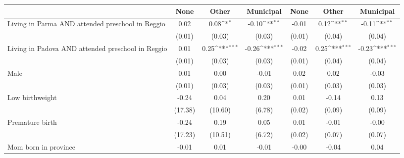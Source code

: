{
\def\sym#1{\ifmmode^{#1}\else\(^{#1}\)\fi}
\begin{tabular}{l*{6}{c}}
\toprule
                    &\multicolumn{1}{c}{None}&\multicolumn{1}{c}{Other}&\multicolumn{1}{c}{Municipal}&\multicolumn{1}{c}{None}&\multicolumn{1}{c}{Other}&\multicolumn{1}{c}{Municipal}\\
\midrule
Living in Parma AND attended preschool in Reggio&        0.02         &        0.08\sym{*}  &       -0.10\sym{**} &       -0.01         &        0.12\sym{**} &       -0.11\sym{**} \\
                    &      (0.01)         &      (0.03)         &      (0.03)         &      (0.01)         &      (0.04)         &      (0.04)         \\
\addlinespace
Living in Padova AND attended preschool in Reggio&        0.01         &        0.25\sym{***}&       -0.26\sym{***}&       -0.02         &        0.25\sym{***}&       -0.23\sym{***}\\
                    &      (0.01)         &      (0.03)         &      (0.03)         &      (0.01)         &      (0.04)         &      (0.04)         \\
\addlinespace
Male                &        0.01         &        0.00         &       -0.01         &        0.02         &        0.02         &       -0.03         \\
                    &      (0.01)         &      (0.03)         &      (0.03)         &      (0.01)         &      (0.03)         &      (0.03)         \\
\addlinespace
Low birthweight     &       -0.24         &        0.04         &        0.20         &        0.01         &       -0.14         &        0.13         \\
                    &     (17.38)         &     (10.60)         &      (6.78)         &      (0.02)         &      (0.09)         &      (0.09)         \\
\addlinespace
Premature birth     &       -0.24         &        0.19         &        0.05         &        0.01         &       -0.01         &       -0.00         \\
                    &     (17.23)         &     (10.51)         &      (6.72)         &      (0.02)         &      (0.07)         &      (0.07)         \\
\addlinespace
Mom born in province&       -0.01         &        0.01         &       -0.01         &       -0.00         &       -0.04         &        0.04         \\

\end{tabular}}
